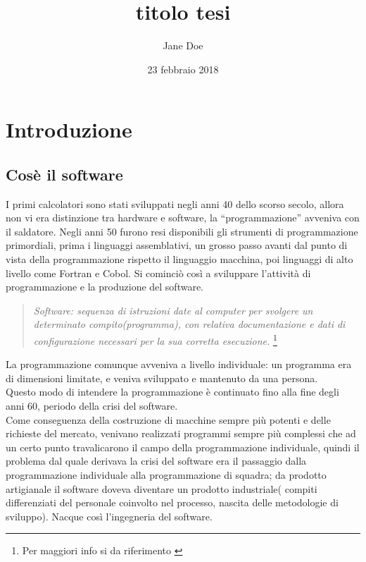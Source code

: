 \documentclass[a4paper,11pt]{book}
\title{titolo tesi}
\author{Jane Doe}
\date{23 febbraio 2018}
\begin{document}
	\maketitle
	\tableofcontents
	\chapter{Introduzione}
		\section{Cosè il software}
		I primi calcolatori sono stati sviluppati negli anni 40 dello scorso secolo, allora non vi era distinzione tra hardware e software, la “programmazione” avveniva con il saldatore. Negli anni 50 furono resi disponibili gli strumenti di programmazione primordiali, prima i linguaggi assemblativi, un grosso passo avanti dal punto di vista della programmazione rispetto il linguaggio
		macchina, poi linguaggi di alto livello come Fortran e Cobol.
		Si cominciò così a sviluppare l’attività di programmazione e la produzione del software.
		\begin{quotation}
			\textit{Software: sequenza di istruzioni date al computer per svolgere un determinato compito(programma), con relativa documentazione e dati di configurazione necessari per la sua corretta esecuzione.}
			\footnote{Per maggiori info si da riferimento \cite{libro:is}}
		\end{quotation}
		La programmazione comunque avveniva a livello individuale: un programma era di dimensioni limitate, e veniva sviluppato e mantenuto da una persona.\\
		Questo modo di intendere la programmazione è continuato fino alla fine degli anni 60, periodo della crisi del software.\\
		Come conseguenza della costruzione di macchine sempre più potenti e delle richieste del mercato, venivano realizzati programmi sempre più complessi che ad un certo punto travalicarono il campo della programmazione individuale,		quindi il problema dal quale derivava la crisi del software era il passaggio dalla programmazione individuale alla programmazione di squadra; da
		prodotto artigianale il software doveva diventare un prodotto industriale( compiti differenziati del personale coinvolto nel processo, nascita delle metodologie di sviluppo). Nacque così l’ingegneria del software.
		
		\newpage
		
\end{document}
